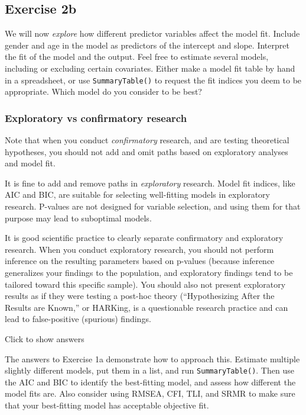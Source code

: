 \documentclass[
]{book}
\begin{document}
\hypertarget{exercise-2b}{%
\subsection{Exercise 2b}\label{exercise-2b}}

We will now \emph{explore} how different predictor variables affect the model fit.
Include gender and age in the model as predictors of the intercept and slope. Interpret the fit of the model
and the output.
Feel free to estimate several models, including or excluding certain covariates.
Either make a model fit table by hand in a spreadsheet, or use \texttt{SummaryTable()} to request the fit indices you deem to be appropriate.
Which model do you consider to be best?

\hypertarget{exploratory-vs-confirmatory-research}{%
\subsubsection{Exploratory vs confirmatory research}\label{exploratory-vs-confirmatory-research}}

Note that when you conduct \emph{confirmatory} research, and are testing theoretical hypotheses, you should not add and omit paths based on exploratory analyses and model fit.

It is fine to add and remove paths in \emph{exploratory} research. Model fit indices, like AIC and BIC, are suitable for selecting well-fitting models in exploratory research. P-values are not designed for variable selection, and using them for that purpose may lead to suboptimal models.

It is good scientific practice to clearly separate confirmatory and exploratory research. When you conduct exploratory research, you should not perform inference on the resulting parameters based on p-values (because inference generalizes your findings to the population, and exploratory findings tend to be tailored toward this specific sample).
You should also not present exploratory results as if they were testing a post-hoc theory (``Hypothesizing After the Results are Known,'' or HARKing, is a questionable research practice and can lead to false-positive (spurious) findings.

Click to show answers

The answers to Exercise 1a demonstrate how to approach this.
Estimate multiple slightly different models, put them in a list, and run \texttt{SummaryTable()}.
Then use the AIC and BIC to identify the best-fitting model,
and assess how different the model fits are.
Also consider using RMSEA, CFI, TLI, and SRMR to make sure that your best-fitting
model has acceptable objective fit.
\end{document}

